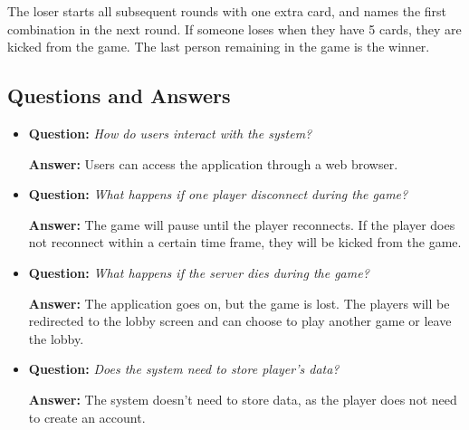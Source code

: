 \documentclass{scrartcl}
\begin{document}
The loser starts all subsequent rounds with one extra card, and names the first combination in the
next round. If someone loses when they have 5 cards, they are kicked from the game.
The last person remaining in the game is the winner.

\subsection{Questions and Answers}\label{questions-and-answers}
\begin{itemize}
      \item \textbf{Question:} \emph{How do users interact with the system?}\par
            \textbf{Answer:} Users can access the application through a web browser.
      \item \textbf{Question:} \emph{What happens if one player disconnect during the game?}\par
            \textbf{Answer:} The game will pause until the player reconnects. If the player does not
            reconnect within a certain time frame, they will be kicked from the game.
      \item \textbf{Question:} \emph{What happens if the server dies during the game?}\par
            \textbf{Answer:} The application goes on, but the game is lost. The players will be
            redirected to the lobby screen and can choose to play another game or leave the lobby.
      \item \textbf{Question:} \emph{Does the system need to store player's data?}\par
            \textbf{Answer:} The system doesn't need to store data, as the player does not need to
            create an account.
\end{itemize}
\end{document}
